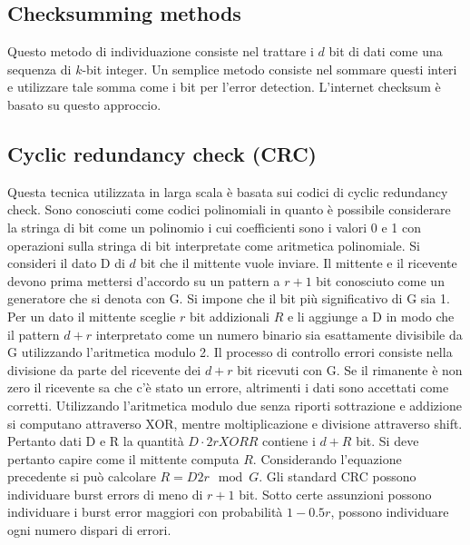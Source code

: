 \subsection{Checksumming methods}
Questo metodo di individuazione consiste nel trattare i $d$ bit di dati come una sequenza di $k$-bit integer. Un semplice metodo consiste nel sommare questi interi e utilizzare tale somma come i bit per l'error
detection. L'internet checksum \`e basato su questo approccio. 
\subsection{Cyclic redundancy check (CRC)}
Questa tecnica utilizzata in larga scala \`e basata sui codici di cyclic redundancy check. Sono conosciuti come codici polinomiali in quanto \`e possibile considerare la stringa di bit come un polinomio i cui 
coefficienti sono i valori 0 e 1 con operazioni sulla stringa di bit interpretate come aritmetica polinomiale. Si consideri il dato D di $d$ bit che il mittente vuole inviare. Il mittente e il ricevente devono prima 
mettersi d'accordo su un pattern a $r+1$ bit conosciuto come un generatore che si denota con G. Si impone che il bit pi\`u significativo di G sia 1. Per un dato il mittente sceglie $r$ bit addizionali $R$ e li 
aggiunge a D in modo che il pattern $d+r$ interpretato come un numero binario sia esattamente divisibile da G utilizzando l'aritmetica modulo 2. Il processo di controllo errori consiste nella divisione da parte 
del ricevente dei $d+r$ bit ricevuti con G. Se il rimanente \`e non zero il ricevente sa che c'\`e stato un errore, altrimenti i dati sono accettati come corretti. Utilizzando l'aritmetica modulo due senza riporti
sottrazione e addizione si computano attraverso XOR, mentre moltiplicazione e divisione attraverso shift. Pertanto dati D e R la quantit\`a $D\cdot 2r XOR R$ contiene i $d+R$ bit. Si deve pertanto capire come
il mittente computa $R$. Considerando l'equazione precedente si pu\`o calcolare $R=D2r\mod G$. Gli standard CRC possono individuare burst errors di meno di $r+1$ bit. Sotto certe assunzioni possono 
individuare i burst error maggiori con probabilit\`a $1-0.5r$, possono individuare ogni numero dispari di errori. 
